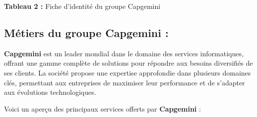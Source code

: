 \documentclass[12pt,a4paper,twoside]{report}
\begin{document}
\begin{center}
\textcolor{capgeminiblue}{\textbf{Tableau 2 :}} Fiche d'identité du groupe Capgemini
\end{center}

\hypertarget{muxe9tiers-du-groupe-capgemini}{%
\subsection{Métiers du groupe Capgemini
:}\label{muxe9tiers-du-groupe-capgemini}}

\textbf{Capgemini} est un leader mondial dans le domaine des services
informatiques, offrant une gamme complète de solutions pour répondre aux
besoins diversifiés de ses clients. La société propose une expertise
approfondie dans plusieurs domaines clés, permettant aux entreprises de
maximiser leur performance et de s'adapter aux évolutions
technologiques.

Voici un aperçu des principaux services offerts par \textbf{Capgemini} :
\end{document}
